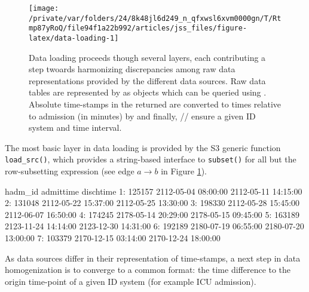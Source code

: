 \documentclass[
  notitle]{jss}
\begin{document}
\begin{CodeChunk}
\begin{figure}

{\centering \texttt{[image: /private/var/folders/24/8k48jl6d249\_n\_qfxwsl6xvm0000gn/T/Rtmp87yRoQ/file94f1a22b992/articles/jss\_files/figure-latex/data-loading-1]} 

}

\caption{Data loading proceeds though several layers, each contributing a step twoards harmonizing discrepancies among raw data representations provided by the different data sources. Raw data tables are represented by  as  objects which can be queried using . Absolute time-stamps in the returned  are converted to times relative to admission (in minutes) by  and finally, /\allowbreak{}/\allowbreak{} ensure a given ID system and time interval.}\label{fig:data-loading}
\end{figure}
\end{CodeChunk}

The most basic layer in data loading is provided by the S3 generic
function \texttt{load\_src()}, which provides a string-based interface
to \texttt{subset()} for all but the row-subsetting expression (see edge
\(a \to b\) in Figure \ref{fig:data-loading}).

\begin{CodeChunk}
\begin{CodeOutput}
   hadm_id           admittime           dischtime
1:  125157 2112-05-04 08:00:00 2112-05-11 14:15:00
2:  131048 2112-05-22 15:37:00 2112-05-25 13:30:00
3:  198330 2112-05-28 15:45:00 2112-06-07 16:50:00
4:  174245 2178-05-14 20:29:00 2178-05-15 09:45:00
5:  163189 2123-11-24 14:14:00 2123-12-30 14:31:00
6:  192189 2180-07-19 06:55:00 2180-07-20 13:00:00
7:  103379 2170-12-15 03:14:00 2170-12-24 18:00:00
\end{CodeOutput}
\end{CodeChunk}

As data sources differ in their representation of time-stamps, a next
step in data homogenization is to converge to a common format: the time
difference to the origin time-point of a given ID system (for example
ICU admission).
\end{document}
